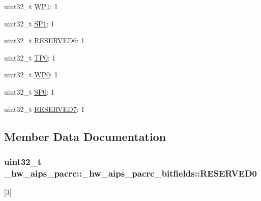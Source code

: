 \begin{DoxyCompactItemize}
\item 
uint32\+\_\+t \hyperlink{struct__hw__aips__pacrc_1_1__hw__aips__pacrc__bitfields_a67f3019036c816a94188b9ebdbe469bb}{W\+P1}\+: 1
\item 
uint32\+\_\+t \hyperlink{struct__hw__aips__pacrc_1_1__hw__aips__pacrc__bitfields_a4fd2618d1a49a2fb89d80878663ddb6f}{S\+P1}\+: 1
\item 
uint32\+\_\+t \hyperlink{struct__hw__aips__pacrc_1_1__hw__aips__pacrc__bitfields_a2e5160d61c9b5b9e504980967cd2b3b1}{R\+E\+S\+E\+R\+V\+E\+D6}\+: 1
\item 
uint32\+\_\+t \hyperlink{struct__hw__aips__pacrc_1_1__hw__aips__pacrc__bitfields_a9aaf0c77b3d7cc896f978e2bd9494a9b}{T\+P0}\+: 1
\item 
uint32\+\_\+t \hyperlink{struct__hw__aips__pacrc_1_1__hw__aips__pacrc__bitfields_a24b2e8d4ad4464fa82c3d2917b552df4}{W\+P0}\+: 1
\item 
uint32\+\_\+t \hyperlink{struct__hw__aips__pacrc_1_1__hw__aips__pacrc__bitfields_a8bc5e70dcfb7f093a31bd1479959e075}{S\+P0}\+: 1
\item 
uint32\+\_\+t \hyperlink{struct__hw__aips__pacrc_1_1__hw__aips__pacrc__bitfields_a819754ca94da689544a4ea8e1b3ae373}{R\+E\+S\+E\+R\+V\+E\+D7}\+: 1
\end{DoxyCompactItemize}


\subsection{Member Data Documentation}
\subsubsection[{\texorpdfstring{R\+E\+S\+E\+R\+V\+E\+D0}{RESERVED0}}]{\setlength{\rightskip}{0pt plus 5cm}uint32\+\_\+t \+\_\+hw\+\_\+aips\+\_\+pacrc\+::\+\_\+hw\+\_\+aips\+\_\+pacrc\+\_\+bitfields\+::\+R\+E\+S\+E\+R\+V\+E\+D0}\hypertarget{struct__hw__aips__pacrc_1_1__hw__aips__pacrc__bitfields_a685f328a9fcca51d5af954e89f37fba5}{}\label{struct__hw__aips__pacrc_1_1__hw__aips__pacrc__bitfields_a685f328a9fcca51d5af954e89f37fba5}
\mbox{[}3\mbox{]} 
